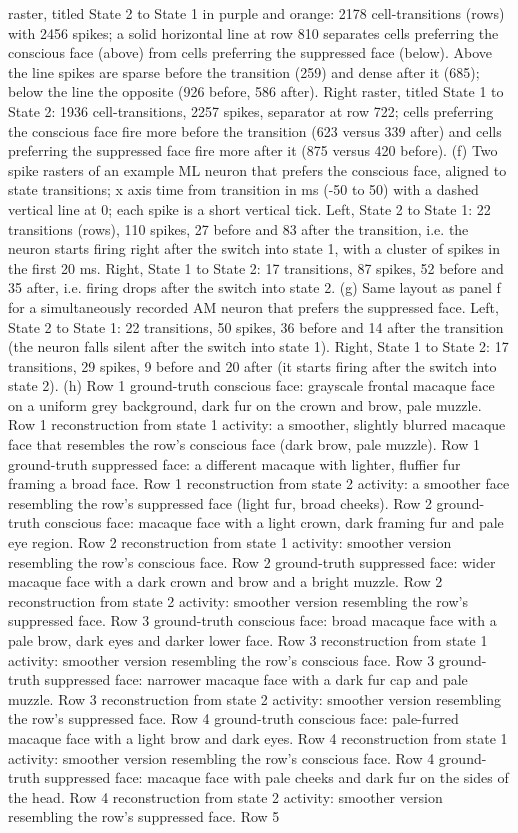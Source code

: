 \documentclass{article}
\begin{document}
raster, titled State 2 to State 1 in purple and orange: 2178 cell-transitions (rows) with 2456 spikes; a solid horizontal line at row 810 separates cells preferring the conscious face (above) from cells preferring the suppressed face (below). Above the line spikes are sparse before the transition (259) and dense after it (685); below the line the opposite (926 before, 586 after). Right raster, titled State 1 to State 2: 1936 cell-transitions, 2257 spikes, separator at row 722; cells preferring the conscious face fire more before the transition (623 versus 339 after) and cells preferring the suppressed face fire more after it (875 versus 420 before). (f) Two spike rasters of an example ML neuron that prefers the conscious face, aligned to state transitions; x axis time from transition in ms (-50 to 50) with a dashed vertical line at 0; each spike is a short vertical tick. Left, State 2 to State 1: 22 transitions (rows), 110 spikes, 27 before and 83 after the transition, i.e. the neuron starts firing right after the switch into state 1, with a cluster of spikes in the first 20 ms. Right, State 1 to State 2: 17 transitions, 87 spikes, 52 before and 35 after, i.e. firing drops after the switch into state 2. (g) Same layout as panel f for a simultaneously recorded AM neuron that prefers the suppressed face. Left, State 2 to State 1: 22 transitions, 50 spikes, 36 before and 14 after the transition (the neuron falls silent after the switch into state 1). Right, State 1 to State 2: 17 transitions, 29 spikes, 9 before and 20 after (it starts firing after the switch into state 2). (h) Row 1 ground-truth conscious face: grayscale frontal macaque face on a uniform grey background, dark fur on the crown and brow, pale muzzle. Row 1 reconstruction from state 1 activity: a smoother, slightly blurred macaque face that resembles the row's conscious face (dark brow, pale muzzle). Row 1 ground-truth suppressed face: a different macaque with lighter, fluffier fur framing a broad face. Row 1 reconstruction from state 2 activity: a smoother face resembling the row's suppressed face (light fur, broad cheeks). Row 2 ground-truth conscious face: macaque face with a light crown, dark framing fur and pale eye region. Row 2 reconstruction from state 1 activity: smoother version resembling the row's conscious face. Row 2 ground-truth suppressed face: wider macaque face with a dark crown and brow and a bright muzzle. Row 2 reconstruction from state 2 activity: smoother version resembling the row's suppressed face. Row 3 ground-truth conscious face: broad macaque face with a pale brow, dark eyes and darker lower face. Row 3 reconstruction from state 1 activity: smoother version resembling the row's conscious face. Row 3 ground-truth suppressed face: narrower macaque face with a dark fur cap and pale muzzle. Row 3 reconstruction from state 2 activity: smoother version resembling the row's suppressed face. Row 4 ground-truth conscious face: pale-furred macaque face with a light brow and dark eyes. Row 4 reconstruction from state 1 activity: smoother version resembling the row's conscious face. Row 4 ground-truth suppressed face: macaque face with pale cheeks and dark fur on the sides of the head. Row 4 reconstruction from state 2 activity: smoother version resembling the row's suppressed face. Row 5 
\end{document}
